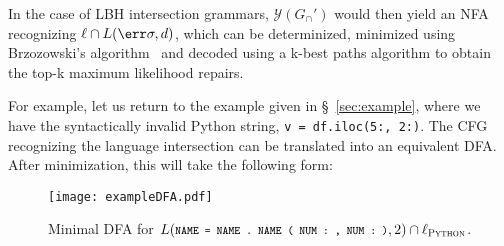 \documentclass[runningheads]{llncs}
\begin{document}
%
%
%

  In the case of LBH intersection grammars, $\mathcal{Y}(G_\cap')$ would then yield an NFA recognizing $\ell\cap L(\err\sigma, d)$, which can be determinized, minimized using Brzozowski's algorithm~\cite{brzozowski1964derivatives} and decoded using a k-best paths algorithm to obtain the top-k maximum likelihood repairs.

For example, let us return to the example given in \S~\ref{sec:example}, where we have the syntactically invalid Python string, \texttt{v = df.iloc(5:, 2:)}. The CFG recognizing the language intersection can be translated into an equivalent DFA. After minimization, this will take the following form:

\begin{figure}[H]
  \centering
  \texttt{[image: exampleDFA.pdf]}
  \caption{Minimal DFA for $L(\footnotesize{\texttt{NAME = NAME . NAME ( NUM : , NUM : )}}, 2) \cap \ell_\textsc{Python}$.}
  \label{fig:exampleDFA}
\end{figure}
\end{document}

